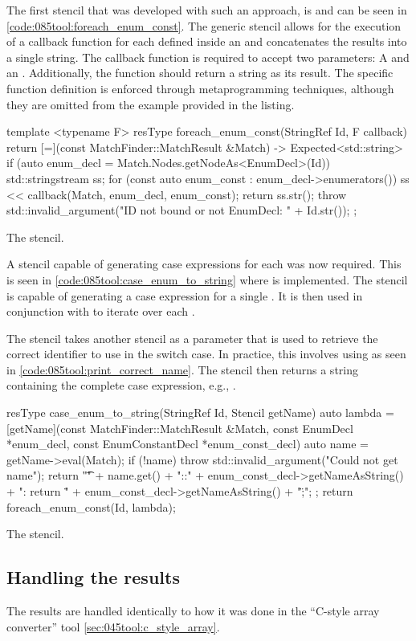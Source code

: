 The first stencil that was developed with such an approach, is  and can be seen in \cref{code:085tool:foreach_enum_const}.
The generic stencil allows for the execution of a callback function for each  defined inside an  and concatenates the results into a single string.
The callback function is required to accept two parameters: A  and an . Additionally, the function should return a string as its result.
The specific function definition is enforced through metaprogramming techniques, although they are omitted from the example provided in the listing.

\begin{listing}[H]
    \begin{cppcode}
template <typename F>
resType foreach_enum_const(StringRef Id, F callback) {
	return [=](const MatchFinder::MatchResult &Match) -> Expected<std::string> {
		if (auto enum_decl = Match.Nodes.getNodeAs<EnumDecl>(Id)) {
			std::stringstream ss;
			for (const auto enum_const : enum_decl->enumerators()) {
				ss << callback(Match, enum_decl, enum_const);
			}
			return ss.str();
		}
		throw std::invalid_argument("ID not bound or not EnumDecl: " + Id.str());
	};
}
    \end{cppcode}
    \caption{The  stencil.}
    \label{code:085tool:foreach_enum_const}
\end{listing}

A stencil capable of generating case expressions for each  was now required. This is seen in \cref{code:085tool:case_enum_to_string} where  is implemented.
The stencil is capable of generating a case expression for a single . It is then used in conjunction with  to iterate over each .

The stencil takes another stencil as a parameter that is used to retrieve the correct identifier to use in the switch case. In practice, this involves using  as seen in \cref{code:085tool:print_correct_name}.
The stencil then returns a string containing the complete case expression, e.g., .

\begin{listing}[H]
    \begin{cppcode}
resType case_enum_to_string(StringRef Id, Stencil getName) {
	auto lambda = [getName](const MatchFinder::MatchResult &Match, const EnumDecl *enum_decl,
					   const EnumConstantDecl *enum_const_decl) {
			auto name = getName->eval(Match);
			if (!name) {
				throw std::invalid_argument("Could not get name");
			}
			return "\t\tcase " + name.get() +
				   "::" + enum_const_decl->getNameAsString() + ": return \"" +
				   enum_const_decl->getNameAsString() + "\";\n";
		};
	return foreach_enum_const(Id, lambda);
}
    \end{cppcode}
    \caption{The  stencil.}
    \label{code:085tool:case_enum_to_string}
\end{listing}

\subsection{Handling the results}
The results are handled identically to how it was done in the ``C-style array converter'' tool \cref{sec:045tool:c_style_array}.